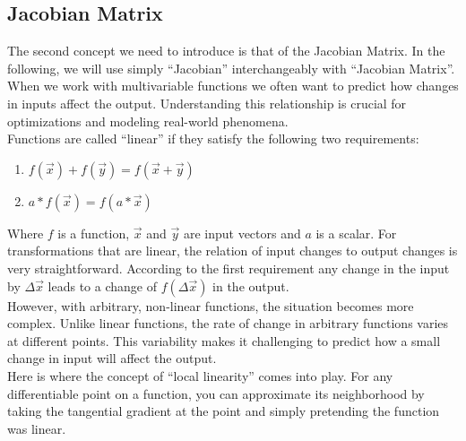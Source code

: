 \documentclass[journal]{IEEEtran}
\begin{document}
\subsection{Jacobian Matrix}
The second concept we need to introduce is that of the Jacobian Matrix. In the following, we will use simply ``Jacobian'' interchangeably with ``Jacobian Matrix''.
When we work with multivariable functions we often want to predict how changes in inputs affect the output.
Understanding this relationship is crucial for optimizations and modeling real-world phenomena.\\
Functions are called ``linear'' if they satisfy the following two requirements:
\begin{enumerate}
\item $f(\vec{x})+f(\vec{y}) = f(\vec{x} + \vec{y})$
\item $a * f(\vec{x}) = f(a * \vec{x})$
\end{enumerate}
Where $f$ is a function, $\vec{x}$ and $\vec{y}$ are input vectors and $a$ is a scalar.
For transformations that are linear, the relation of input changes to output changes is very straightforward. According to the first requirement any change in the input by $\Delta\vec{x}$ leads to a change of $f(\Delta\vec{x})$ in the output.\\
However, with arbitrary, non-linear functions, the situation becomes more complex. Unlike linear functions, the rate of change in arbitrary functions varies at different points. This variability makes it challenging to predict how a small change in input will affect the output.\\
Here is where the concept of ``local linearity'' comes into play. For any differentiable point on a function, you can approximate its neighborhood by taking the tangential gradient at the point and simply pretending the function was linear.\\

\begin{figure}
\centering
{}
\end{figure}
\end{document}
